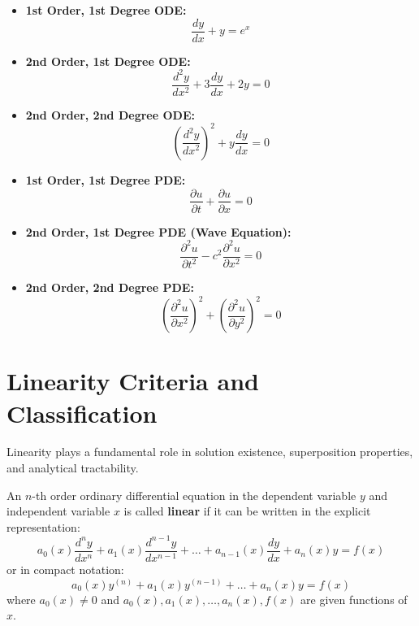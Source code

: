 \documentclass[11pt, a4paper, openany, oneside]{book}
\begin{document}
\begin{summarybox}
    \begin{itemize}[leftmargin=0.6cm]
        \item \textbf{1st Order, 1st Degree ODE:}
        \[ \frac{dy}{dx} + y = e^x \]
        \item \textbf{2nd Order, 1st Degree ODE:}
        \[ \frac{d^2 y}{dx^2} + 3\frac{dy}{dx} + 2y = 0 \]
        \item \textbf{2nd Order, 2nd Degree ODE:}
        \[ \left(\frac{d^2 y}{dx^2}\right)^2 + y \frac{dy}{dx} = 0 \]
        \item \textbf{1st Order, 1st Degree PDE:}
        \[ \frac{\partial u}{\partial t} + \frac{\partial u}{\partial x} = 0 \]
        \item \textbf{2nd Order, 1st Degree PDE (Wave Equation):}
        \[ \frac{\partial^2 u}{\partial t^2} - c^2 \frac{\partial^2 u}{\partial x^2} = 0 \]
        \item \textbf{2nd Order, 2nd Degree PDE:}
        \[ \left(\frac{\partial^2 u}{\partial x^2}\right)^2 + \left(\frac{\partial^2 u}{\partial y^2}\right)^2 = 0 \]
    \end{itemize}
\end{summarybox}

\section{Linearity Criteria and Classification}

Linearity plays a fundamental role in solution existence, superposition properties, and analytical tractability.

\begin{definitionbox}
An $n$-th order ordinary differential equation in the dependent variable $y$ and independent variable $x$ is called \textbf{linear} if it can be written in the explicit representation:
\begin{equation}
    a_0(x) \frac{d^n y}{dx^n} + a_1(x) \frac{d^{n-1} y}{dx^{n-1}} + \dots + a_{n-1}(x) \frac{dy}{dx} + a_n(x) y = f(x)
\end{equation}
or in compact notation:
\begin{equation}
    a_0(x) y^{(n)} + a_1(x) y^{(n-1)} + \dots + a_n(x) y = f(x)
\end{equation}
where $a_0(x) \neq 0$ and $a_0(x), a_1(x), \dots, a_n(x), f(x)$ are given functions of $x$.
\end{definitionbox}
\end{document}
